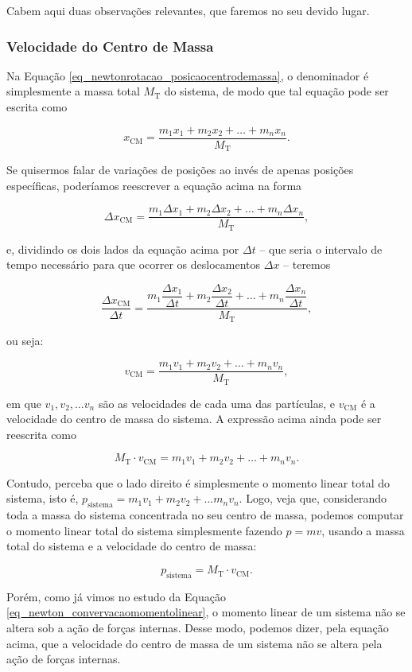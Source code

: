 
Cabem aqui duas observações relevantes, que faremos no seu devido lugar.

\subsubsection{Velocidade do Centro de Massa}

Na Equação \eqref{eq_newtonrotacao_posicaocentrodemassa}, o denominador é simplesmente a massa total $M_\text{T}$ do sistema, de modo que tal equação pode ser escrita como

$$ x_\text{CM} = \dfrac{m_1x_1 + m_2x_2 + \dots + m_nx_n}{M_\text{T}}.$$

Se quisermos falar de variações de posições ao invés de apenas posições específicas, poderíamos reescrever a equação acima na forma 

$$ \Delta x_\text{CM} = \dfrac{m_1 \Delta x_1 + m_2 \Delta x_2 + \dots + m_n \Delta x_n}{M_\text{T}},$$

\noindent e, dividindo os dois lados da equação acima por $\Delta t$ -- que seria o intervalo de tempo necessário para que ocorrer os deslocamentos $\Delta x$ -- teremos

$$ \dfrac{\Delta x_\text{CM}}{\Delta t} = \dfrac{m_1 \dfrac{\Delta x_1}{\Delta t} + m_2 \dfrac{\Delta x_2}{\Delta t} + \dots + m_n \dfrac{\Delta x_n}{\Delta t}}{M_\text{T}},$$

\noindent ou seja:

$$  v_\text{CM} = \dfrac{m_1 v_1 + m_2 v_2 + \dots + m_n v_n}{M_\text{T}},$$

\noindent em que $v_1, v_2, \dots v_n$ são as velocidades de cada uma das partículas, e $v_\text{CM}$ é a velocidade do centro de massa do sistema. A expressão acima ainda pode ser reescrita como 

$$  M_\text{T} \cdot v_\text{CM} =  m_1 v_1 + m_2 v_2 + \dots + m_n v_n. $$ 

Contudo, perceba que o lado direito é simplesmente o momento linear total do sistema, isto é, $p_\text{sistema} = m_1v_1 + m_2v_2 + \dots m_nv_n.$ Logo, veja que, considerando toda a massa do sistema concentrada no seu centro de massa, podemos computar o momento linear total do sistema simplesmente fazendo $p=mv$, usando a massa total do sistema e a velocidade do centro de massa:


$$ p_\text{sistema}=  M_\text{T} \cdot v_\text{CM}. $$

Porém, como já vimos no estudo da Equação \eqref{eq_newton_convervacaomomentolinear}, o momento linear de um sistema não se altera sob a ação de forças internas. Desse modo, podemos dizer, pela equação acima, que a velocidade do centro de massa de um sistema não se altera pela ação de forças internas.


